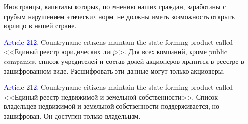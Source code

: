 \documentclass[11pt]{article}
\theoremstyle{remark}
\theoremstyle{definition}
\begin{document}

Иностранцы, капиталы которых, по мнению наших граждан, заработаны с грубым нарушением этических норм, не должны иметь возможность открыть юрлицо в нашей стране. %













\color{black}




\textcolor{blue}{Article 212.} Countryname citizens maintain the state-forming product called <<Единый реестр юридических лиц>>. Для всех компаний, кроме public companies, список учредителей и состав долей акционеров хранится в реестре в зашифрованном виде. Расшифровать эти данные могут только акционеры.





\textcolor{blue}{Article 212.} Countryname citizens maintain the state-forming product called <<Единый реестр недвижимой и земельной собственности>>. Список владельцев недвижимой и земельной собственности поддерживается, но зашифрован. Он доступен только владельцам.
\end{document}
